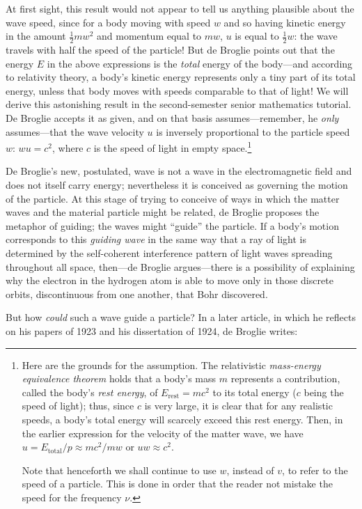At first sight, this result would not appear to tell us anything
plausible about the wave speed, since for a body moving with speed
$w$ and so having kinetic energy in the amount $\frac{1}{2}mw^2$ and
momentum equal to $mw$, $u$ is equal to $\frac{1}{2}w$: the wave
travels with half the speed of the particle! But de Broglie points out
that the energy $E$ in the above expressions is the \emph{total}
energy of the body---and according to relativity theory, a body's
kinetic energy represents only a tiny part of its total energy, unless
that body moves with speeds comparable to that of light! We will derive
this astonishing result in the second-semester senior mathematics
tutorial. De Broglie accepts it as given, and on that basis
assumes---remember, he \emph{only} assumes---that the wave velocity
$u$ is inversely proportional to the particle speed $w$:
$wu = c^2$, where $c$ is the speed of light in empty
space.\footnote{Here are the grounds for the assumption. The
  relativistic \emph{mass-energy equivalence theorem} holds that a
  body's mass $m$ represents a contribution, called the body's
  \emph{rest energy}, of $E_{\text{rest}} = mc^2$ to its total energy
  ($c$ being the speed of light); thus, since $c$ is very
  large, it is clear that for any realistic speeds, a body's total
  energy will scarcely exceed this rest energy. Then, in the earlier
  expression for the velocity of the matter wave, we have $u =
  E_{\text{total}}/p \approx mc^2/mw$ or $uw \approx c^2$.

  Note that henceforth we shall continue to use $w$, instead of
  $v$, to refer to the speed of a particle. This is done in order
  that the reader not mistake the speed for the frequency $\nu$.}

De Broglie's new, postulated, wave is not a wave in the electromagnetic
field and does not itself carry energy; nevertheless it is conceived as
governing the motion of the particle. At this stage of trying to
conceive of ways in which the matter waves and the material particle
might be related, de Broglie proposes the metaphor of guiding; the waves
might ``guide'' the particle. If a body's motion corresponds to this
\emph{guiding wave} in the same way that a ray of light is determined by
the self-coherent interference pattern of light waves spreading
throughout all space, then---de Broglie argues---there is a possibility
of explaining why the electron in the hydrogen atom is able to move only
in those discrete orbits, discontinuous from one another, that Bohr
discovered.

But how \emph{could} such a wave guide a particle? In a later article,
in which he reflects on his papers of 1923 and his dissertation of 1924,
de Broglie writes:

